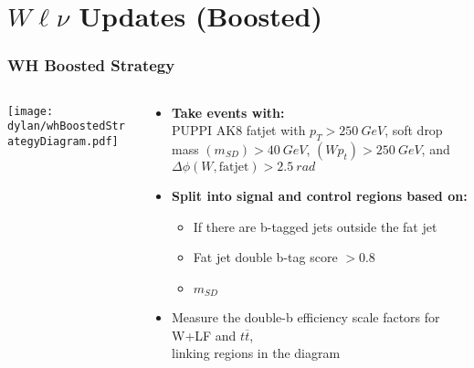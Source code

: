 \documentclass{beamer}
\begin{document}
\section{$W\ell\nu$ Updates (Boosted)}

\begin{frame}
  \frametitle{WH Boosted Strategy}
  \begin{columns}
    \begin{column}{0.4\linewidth}
      \hspace*{-0.2\linewidth}
      \texttt{[image: dylan/whBoostedStrategyDiagram.pdf]}
    \end{column}
    \begin{column}{0.6\linewidth}
      \begin{itemize}
      \item {\bf Take events with:} \\
        PUPPI AK8 fatjet with $p_T > \SI{250}{GeV}$,
        soft drop mass $(m_{SD}) > \SI{40}{GeV}$,
        $(W p_t) > \SI{250}{GeV}$, and
        $\Delta \phi(W, \mathrm{fatjet}) > \SI{2.5}{rad}$
      \item {\bf Split into signal and control regions based on:}
        \begin{itemize}
        \item If there are b-tagged jets outside the fat jet
        \item Fat jet double b-tag score $> 0.8$
        \item $m_{SD}$
        \end{itemize}
      \item Measure the double-b efficiency scale factors for W+LF and $t\overline{t}$, \\
        linking regions in the diagram
      \end{itemize}
    \end{column}
  \end{columns}
\end{frame}
\end{document}
